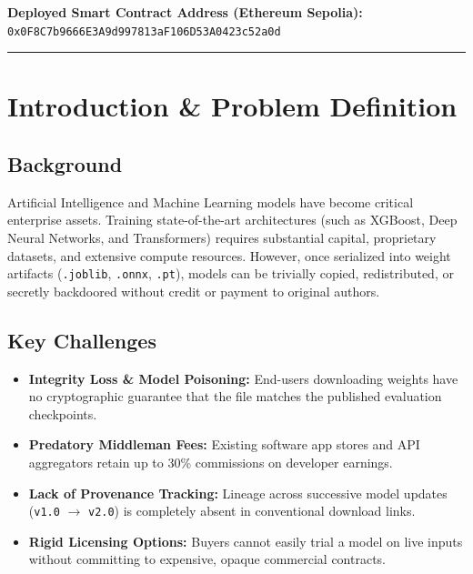 \documentclass[12pt,a4paper]{article}
\begin{document}
\vspace{0.3cm}
\noindent \textbf{Deployed Smart Contract Address (Ethereum Sepolia):} \\
\texttt{0x0F8C7b9666E3A9d997813aF106D53A0423c52a0d}
\vspace{0.4cm}
\hrule

\newpage
\tableofcontents
\newpage

\section{Introduction \& Problem Definition}

\subsection{Background}
Artificial Intelligence and Machine Learning models have become critical enterprise assets. Training state-of-the-art architectures (such as XGBoost, Deep Neural Networks, and Transformers) requires substantial capital, proprietary datasets, and extensive compute resources. However, once serialized into weight artifacts (\texttt{.joblib}, \texttt{.onnx}, \texttt{.pt}), models can be trivially copied, redistributed, or secretly backdoored without credit or payment to original authors.

\subsection{Key Challenges}
\begin{itemize}[leftmargin=1.5em]
    \item \textbf{Integrity Loss \& Model Poisoning:} End-users downloading weights have no cryptographic guarantee that the file matches the published evaluation checkpoints.
    \item \textbf{Predatory Middleman Fees:} Existing software app stores and API aggregators retain up to 30\% commissions on developer earnings.
    \item \textbf{Lack of Provenance Tracking:} Lineage across successive model updates (\texttt{v1.0} $\to$ \texttt{v2.0}) is completely absent in conventional download links.
    \item \textbf{Rigid Licensing Options:} Buyers cannot easily trial a model on live inputs without committing to expensive, opaque commercial contracts.
\end{itemize}
\end{document}

